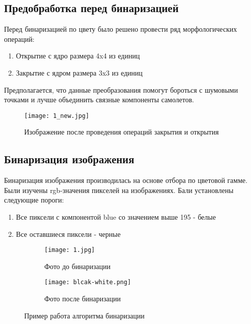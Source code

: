 \documentclass{article}
\begin{document}
\subsection{Предобработка перед бинаризацией}

Перед бинаризацией по цвету было решено провести ряд морфологических операций:

\begin{enumerate}
    \item Открытие с ядро размера 4x4 из единиц
    \item Закрытие с ядром размера 3x3 из единиц
\end{enumerate}

Предполагается, что данные преобразования помогут бороться с шумовыми точками и лучше объединить связные компоненты самолетов.

\begin{figure}[h!]
    \centering
    \texttt{[image: 1\_new.jpg]}
    \caption{Изображение после проведения операций закрытия и открытия}
    \label{fig:enter-label}
\end{figure}

\subsection{Бинаризация изображения}

Бинаризация изображения производилась на основе отбора по цветовой гамме. Были изучены rgb-значения пикселей на изображениях. Бали установлены следующие пороги:

\begin{enumerate}
    \item Все пиксели с компонентой blue со значением выше 195 - белые
    \item Все оставшиеся пиксели - черные
\end{enumerate}

\begin{figure}[h!]
  \centering
  \begin{subfigure}[b]{0.4\linewidth}
    \texttt{[image: 1.jpg]}
    \caption{Фото до бинаризации}
    \label{fig:sub1}
  \end{subfigure}
  \begin{subfigure}[b]{0.4\linewidth}
    \texttt{[image: blcak-white.png]}
    \caption{Фото после бинаризации}
    \label{fig:sub2}
  \end{subfigure}
  \caption{Пример работа алгоритма бинаризации}
  \label{fig:twophotos}
\end{figure}
\end{document}
